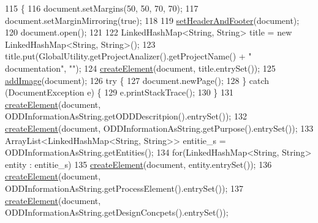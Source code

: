 \begin{DoxyCode}
115                                                    \{
116         document.setMargins(50, 50, 70, 70);
117         document.setMarginMirroring(\textcolor{keyword}{true});
118         
119         \hyperlink{classit_1_1isislab_1_1masonassisteddocumentation_1_1mason_1_1control_1_1_pdf_rtf_generator_add96cb1e39ece24ace1e42aae99082a0}{setHeaderAndFooter}(document);     
120         document.open();
121         
122         LinkedHashMap<String, String> title = \textcolor{keyword}{new} LinkedHashMap<String, String>();
123         title.put(GlobalUtility.getProjectAnalizer().getProjectName() + \textcolor{stringliteral}{" documentation"}, \textcolor{stringliteral}{""});
124         \hyperlink{classit_1_1isislab_1_1masonassisteddocumentation_1_1mason_1_1control_1_1_pdf_rtf_generator_ad3127f275f1af4f9d92f314fb3f29f51}{createElement}(document, title.entrySet());
125         \hyperlink{classit_1_1isislab_1_1masonassisteddocumentation_1_1mason_1_1control_1_1_pdf_rtf_generator_a256d403130ef860861402da49b373042}{addImage}(document);
126         \textcolor{keywordflow}{try} \{
127             document.newPage();
128         \} \textcolor{keywordflow}{catch} (DocumentException e) \{
129             e.printStackTrace();
130         \}
131         \hyperlink{classit_1_1isislab_1_1masonassisteddocumentation_1_1mason_1_1control_1_1_pdf_rtf_generator_ad3127f275f1af4f9d92f314fb3f29f51}{createElement}(document, ODDInformationAsString.getODDDescritpion().entrySet());
132         \hyperlink{classit_1_1isislab_1_1masonassisteddocumentation_1_1mason_1_1control_1_1_pdf_rtf_generator_ad3127f275f1af4f9d92f314fb3f29f51}{createElement}(document, ODDInformationAsString.getPurpose().entrySet());
133         ArrayList<LinkedHashMap<String, String>> entitie\_s = ODDInformationAsString.getEntities();
134         \textcolor{keywordflow}{for}(LinkedHashMap<String, String> entity : entitie\_s)
135             \hyperlink{classit_1_1isislab_1_1masonassisteddocumentation_1_1mason_1_1control_1_1_pdf_rtf_generator_ad3127f275f1af4f9d92f314fb3f29f51}{createElement}(document, entity.entrySet());
136         \hyperlink{classit_1_1isislab_1_1masonassisteddocumentation_1_1mason_1_1control_1_1_pdf_rtf_generator_ad3127f275f1af4f9d92f314fb3f29f51}{createElement}(document, ODDInformationAsString.getProcessElement().entrySet());
137         \hyperlink{classit_1_1isislab_1_1masonassisteddocumentation_1_1mason_1_1control_1_1_pdf_rtf_generator_ad3127f275f1af4f9d92f314fb3f29f51}{createElement}(document, ODDInformationAsString.getDesignConcpets().entrySet());

\end{DoxyCode}
